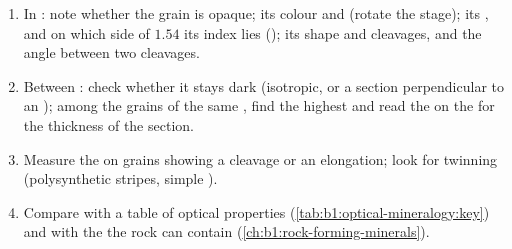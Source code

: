 \begin{method}\label{met:b1:optical-mineralogy:identify}
\begin{enumerate}
  \item In : note whether the grain is opaque; its
        colour and  (rotate the stage); its , and on which
        side of $1.54$ its index lies (); its shape and cleavages,
        and the angle between two cleavages.
  \item Between : check whether it stays dark (isotropic, or a
        section perpendicular to an ); among the grains of the same
        , find the highest  and read the
         on the  for the thickness of the
        section.
  \item Measure the  on grains showing a cleavage or an
        elongation; look for twinning (polysynthetic stripes, simple ).
  \item Compare with a table of optical properties
        (\cref{tab:b1:optical-mineralogy:key}) and with the  the rock
        can contain (\cref{ch:b1:rock-forming-minerals}).
\end{enumerate}
\end{method}

